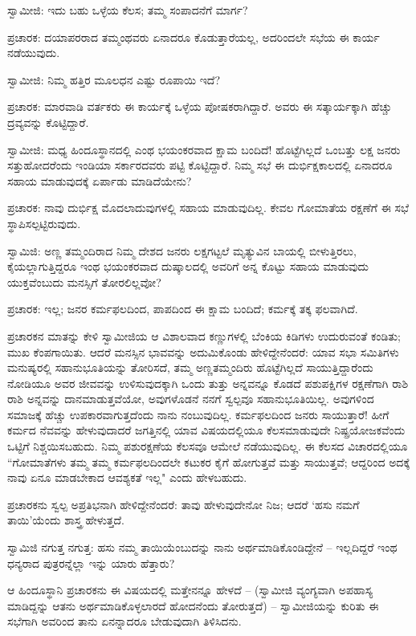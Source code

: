 ಸ್ವಾಮೀಜಿ: ಇದು ಬಹು ಒಳ್ಳೆಯ ಕೆಲಸ; ತಮ್ಮ ಸಂಪಾದನೆಗೆ ಮಾರ್ಗ?

ಪ್ರಚಾರಕ: ದಯಾಪರರಾದ ತಮ್ಮಂಥವರು ಏನಾದರೂ ಕೊಡುತ್ತಾರೆಯಲ್ಲ, ಅದರಿಂದಲೇ ಸಭೆಯ ಈ ಕಾರ್ಯ ನಡೆಯುವುದು.

ಸ್ವಾಮೀಜಿ: ನಿಮ್ಮ ಹತ್ತಿರ ಮೂಲಧನ ಎಷ್ಟು ರೂಪಾಯಿ ಇದೆ?

ಪ್ರಚಾರಕ: ಮಾರವಾಡಿ ವರ್ತಕರು ಈ ಕಾರ್ಯಕ್ಕೆ ಒಳ್ಳೆಯ ಪೋಷಕರಾಗಿದ್ದಾರೆ. ಅವರು ಈ ಸತ್ಕಾರ್ಯಕ್ಕಾಗಿ ಹೆಚ್ಚು ದ್ರವ್ಯವನ್ನು ಕೊಟ್ಟಿದ್ದಾರೆ.

ಸ್ವಾಮೀಜಿ: ಮಧ್ಯ ಹಿಂದೂಸ್ಥಾನದಲ್ಲಿ ಎಂಥ ಭಯಂಕರವಾದ ಕ್ಷಾಮ ಬಂದಿದೆ! ಹೊಟ್ಟೆಗಿಲ್ಲದೆ ಒಂಬತ್ತು ಲಕ್ಷ ಜನರು ಸತ್ತುಹೋದರೆಂದು ಇಂಡಿಯಾ ಸರ್ಕಾರದವರು ಪಟ್ಟಿ ಕೊಟ್ಟಿದ್ದಾರೆ. ನಿಮ್ಮ ಸಭೆ ಈ ದುರ್ಭಿಕ್ಷಕಾಲದಲ್ಲಿ ಏನಾದರೂ ಸಹಾಯ ಮಾಡುವುದಕ್ಕೆ ಏರ್ಪಾಡು ಮಾಡಿದೆಯೇನು?

ಪ್ರಚಾರಕ: ನಾವು ದುರ್ಭಿಕ್ಷ ಮೊದಲಾದುವುಗಳಲ್ಲಿ ಸಹಾಯ ಮಾಡುವುದಿಲ್ಲ. ಕೇವಲ ಗೋಮಾತೆಯ ರಕ್ಷಣೆಗೆ ಈ ಸಭೆ ಸ್ಥಾಪಿಸಲ್ಪಟ್ಟಿರುವುದು.

ಸ್ವಾಮಿಜಿ: ಅಣ್ಣ ತಮ್ಮಂದಿರಾದ ನಿಮ್ಮ ದೇಶದ ಜನರು ಲಕ್ಷಗಟ್ಟಲೆ ಮೃತ್ಯುವಿನ ಬಾಯಲ್ಲಿ ಬೀಳುತ್ತಿರಲು, ಕೈಯಲ್ಲಾಗುತ್ತಿದ್ದರೂ ಇಂಥ ಭಯಂಕರವಾದ ದುಷ್ಕಾಲದಲ್ಲಿ ಅವರಿಗೆ ಅನ್ನ ಕೊಟ್ಟು ಸಹಾಯ ಮಾಡುವುದು ಯುಕ್ತವೆಂಬುದು ಮನಸ್ಸಿಗೆ ತೋರಲಿಲ್ಲವೋ?

ಪ್ರಚಾರಕ: ಇಲ್ಲ; ಜನರ ಕರ್ಮಫಲದಿಂದ, ಪಾಪದಿಂದ ಈ ಕ್ಷಾಮ ಬಂದಿದೆ; ಕರ್ಮಕ್ಕೆ ತಕ್ಕ ಫಲವಾಗಿದೆ.

ಪ್ರಚಾರಕನ ಮಾತನ್ನು ಕೇಳಿ ಸ್ವಾಮೀಜಿಯ ಆ ವಿಶಾಲವಾದ ಕಣ್ಣುಗಳಲ್ಲಿ ಬೆಂಕಿಯ ಕಿಡಿಗಳು ಉದುರುವಂತೆ ಕಂಡಿತು; ಮುಖ ಕೆಂಪಗಾಯಿತು. ಆದರೆ ಮನಸ್ಸಿನ ಭಾವವನ್ನು ಅದುಮಿಕೊಂಡು ಹೇಳಿದ್ದೇನೆಂದರೆ: ಯಾವ ಸಭಾ ಸಮಿತಿಗಳು ಮನುಷ್ಯರಲ್ಲಿ ಸಹಾನುಭೂತಿಯನ್ನು ತೋರಿಸದೆ, ತಮ್ಮ ಅಣ್ಣತಮ್ಮಂದಿರು ಹೊಟ್ಟೆಗಿಲ್ಲದೆ ಸಾಯುತ್ತಿದ್ದಾರೆಂದು ನೋಡಿಯೂ ಅವರ ಜೀವವನ್ನು ಉಳಿಸುವುದಕ್ಕಾಗಿ ಒಂದು ತುತ್ತು ಅನ್ನವನ್ನೂ ಕೊಡದೆ ಪಶುಪಕ್ಷಿಗಳ ರಕ್ಷಣೆಗಾಗಿ ರಾಶಿ ರಾಶಿ ಅನ್ನವನ್ನು ದಾನಮಾಡುತ್ತವೆಯೋ, ಅವುಗಳೊಡನೆ ನನಗೆ ಸ್ವಲ್ಪವೂ ಸಹಾನುಭೂತಿಯಿಲ್ಲ. ಅವುಗಳಿಂದ ಸಮಾಜಕ್ಕೆ ಹೆಚ್ಚು ಉಪಕಾರವಾಗುತ್ತದೆಂದು ನಾನು ನಂಬುವುದಿಲ್ಲ. ಕರ್ಮಫಲದಿಂದ ಜನರು ಸಾಯುತ್ತಾರೆ! ಹೀಗೆ ಕರ್ಮದ ನೆವವನ್ನು ಹೇಳುವುದಾದರೆ ಜಗತ್ತಿನಲ್ಲಿ ಯಾವ ವಿಷಯದಲ್ಲಿಯೂ ಕೆಲಸಮಾಡುವುದೇ ನಿಷ್ಪ್ರಯೋಜಕವೆಂದು ಒಟ್ಟಿಗೆ ನಿಶ್ಚಯಿಸಬಹುದು. ನಿಮ್ಮ ಪಶುರಕ್ಷಣೆಯ ಕೆಲಸವೂ ಆಮೇಲೆ ನಡೆಯುವುದಿಲ್ಲ. ಈ ಕೆಲಸದ ವಿಚಾರದಲ್ಲಿಯೂ “ಗೋಮಾತೆಗಳು ತಮ್ಮ ತಮ್ಮ ಕರ್ಮಫಲದಿಂದಲೇ ಕಟುಕರ ಕೈಗೆ ಹೋಗುತ್ತವೆ ಮತ್ತು ಸಾಯುತ್ತವೆ; ಆದ್ದರಿಂದ ಅದಕ್ಕೆ ನಾವು ಏನೂ ಮಾಡಬೇಕಾದ ಆವಶ್ಯಕತೆ ಇಲ್ಲ" ಎಂದು ಹೇಳಬಹುದು.

ಪ್ರಚಾರಕನು ಸ್ವಲ್ಪ ಅಪ್ರತಿಭನಾಗಿ ಹೇಳಿದ್ದೇನೆಂದರೆ: ತಾವು ಹೇಳುವುದೇನೋ ನಿಜ; ಆದರೆ ‘ಹಸು ನಮಗೆ ತಾಯಿ’ಯೆಂದು ಶಾಸ್ತ್ರ ಹೇಳುತ್ತದೆ.

ಸ್ವಾಮಿಜಿ ನಗುತ್ತ ನಗುತ್ತ: ಹಸು ನಮ್ಮ ತಾಯಿಯೆಂಬುದನ್ನು ನಾನು ಅರ್ಥಮಾಡಿಕೊಂಡಿದ್ದೇನೆ – ಇಲ್ಲದಿದ್ದರೆ ಇಂಥ ಧನ್ಯರಾದ ಪುತ್ರರನ್ನೆಲ್ಲಾ ಇನ್ನು ಯಾರು ಹೆತ್ತಾರು?

ಆ ಹಿಂದೂಸ್ಥಾನಿ ಪ್ರಚಾರಕನು ಈ ವಿಷಯದಲ್ಲಿ ಮತ್ತೇನನ್ನೂ ಹೇಳದೆ – (ಸ್ವಾಮೀಜಿ ವ್ಯಂಗ್ಯವಾಗಿ ಅಪಹಾಸ್ಯ ಮಾಡಿದ್ದನ್ನು ಆತನು ಅರ್ಥಮಾಡಿಕೊಳ್ಳಲಾರದೆ ಹೋದನೆಂದು ತೋರುತ್ತದೆ) – ಸ್ವಾಮೀಜಿಯನ್ನು ಕುರಿತು ಈ ಸಭೆಗಾಗಿ ಅವರಿಂದ ತಾನು ಏನನ್ನಾದರೂ ಬೇಡುವುದಾಗಿ ತಿಳಿಸಿದನು.

